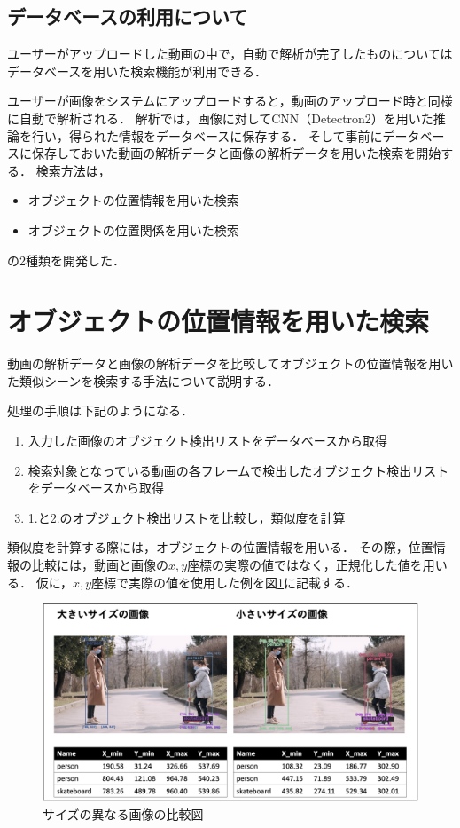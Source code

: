 \documentclass[a4j,12pt,dvipdfmx]{jreport}
\begin{document}
\subsection{データベースの利用について}\label{chap3-3-2}
ユーザーがアップロードした動画の中で，自動で解析が完了したものについてはデータベースを用いた検索機能が利用できる．

ユーザーが画像をシステムにアップロードすると，動画のアップロード時と同様に自動で解析される．
解析では，画像に対してCNN（Detectron2）を用いた推論を行い，得られた情報をデータベースに保存する．
そして事前にデータベースに保存しておいた動画の解析データと画像の解析データを用いた検索を開始する．
検索方法は，
\begin{itemize}
  \item オブジェクトの位置情報を用いた検索
  \item オブジェクトの位置関係を用いた検索
\end{itemize}

の2種類を開発した．

\section{オブジェクトの位置情報を用いた検索}\label{chap3-4}
動画の解析データと画像の解析データを比較してオブジェクトの位置情報を用いた類似シーンを検索する手法について説明する．

処理の手順は下記のようになる．
\begin{enumerate}
  \item 入力した画像のオブジェクト検出リストをデータベースから取得
  \item 検索対象となっている動画の各フレームで検出したオブジェクト検出リストをデータベースから取得
  \item 1.と2.のオブジェクト検出リストを比較し，類似度を計算
\end{enumerate}

類似度を計算する際には，オブジェクトの位置情報を用いる．
その際，位置情報の比較には，動画と画像の$x,y$座標の実際の値ではなく，正規化した値を用いる．
仮に，$x,y$座標で実際の値を使用した例を図\ref{fig:compare}に記載する．

\begin{figure}[t]
  \centering
  \includegraphics[width=13cm]{image/compare.png}
  \caption{サイズの異なる画像の比較図}
  \label{fig:compare}
\end{figure}
\end{document}
